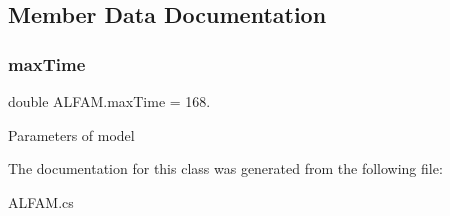 \subsection{Member Data Documentation}
\mbox{\label{class_a_l_f_a_m_a0c0298445d03428301cd76870c188d3a}} 
\subsubsection{\texorpdfstring{maxTime}{maxTime}}
{\footnotesize\ttfamily double A\+L\+F\+A\+M.\+max\+Time = 168.}



Parameters of model 



The documentation for this class was generated from the following file\+:\begin{DoxyCompactItemize}
\item 
A\+L\+F\+A\+M.\+cs\end{DoxyCompactItemize}
